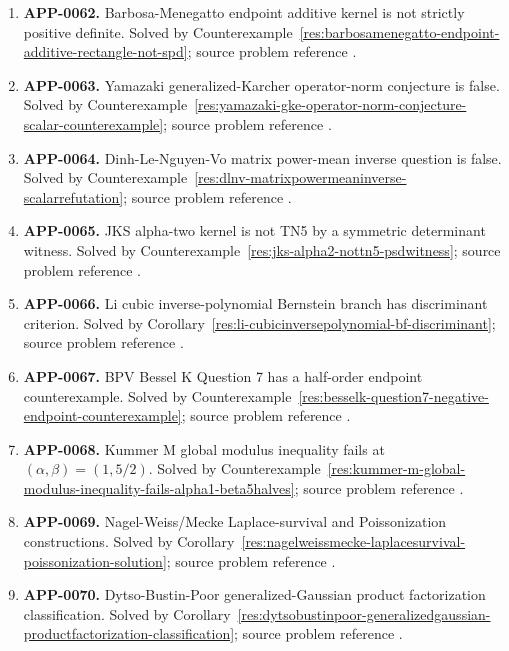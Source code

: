 \documentclass[11pt]{article}
\numberwithin{equation}{section}
\theoremstyle{definition}
\theoremstyle{remark}
\newcommand{\1}{\mathbf 1}
\begin{document}
\begin{enumerate}
\item \label{ledger:app-0062}\textbf{APP-0062.} Barbosa-Menegatto endpoint additive kernel is not strictly positive definite. Solved by Counterexample~\ref{res:barbosamenegatto-endpoint-additive-rectangle-not-spd}; source problem reference \cite{app-app-0062-source}.
\item \label{ledger:app-0063}\textbf{APP-0063.} Yamazaki generalized-Karcher operator-norm conjecture is false. Solved by Counterexample~\ref{res:yamazaki-gke-operator-norm-conjecture-scalar-counterexample}; source problem reference \cite{app-app-0063-source}.
\item \label{ledger:app-0064}\textbf{APP-0064.} Dinh-Le-Nguyen-Vo matrix power-mean inverse question is false. Solved by Counterexample~\ref{res:dlnv-matrixpowermeaninverse-scalarrefutation}; source problem reference \cite{app-app-0064-source}.
\item \label{ledger:app-0065}\textbf{APP-0065.} JKS alpha-two kernel is not TN5 by a symmetric determinant witness. Solved by Counterexample~\ref{res:jks-alpha2-nottn5-psdwitness}; source problem reference \cite{app-app-0065-source}.
\item \label{ledger:app-0066}\textbf{APP-0066.} Li cubic inverse-polynomial Bernstein branch has discriminant criterion. Solved by Corollary~\ref{res:li-cubicinversepolynomial-bf-discriminant}; source problem reference \cite{app-app-0066-source}.
\item \label{ledger:app-0067}\textbf{APP-0067.} BPV Bessel K Question 7 has a half-order endpoint counterexample. Solved by Counterexample~\ref{res:besselk-question7-negative-endpoint-counterexample}; source problem reference \cite{app-app-0056-source}.
\item \label{ledger:app-0068}\textbf{APP-0068.} Kummer M global modulus inequality fails at \((\alpha,\beta)=(1,5/2)\). Solved by Counterexample~\ref{res:kummer-m-global-modulus-inequality-fails-alpha1-beta5halves}; source problem reference \cite{app-app-0068-source}.
\item \label{ledger:app-0069}\textbf{APP-0069.} Nagel-Weiss/Mecke Laplace-survival and Poissonization constructions. Solved by Corollary~\ref{res:nagelweissmecke-laplacesurvival-poissonization-solution}; source problem reference \cite{app-app-0069-source}.
\item \label{ledger:app-0070}\textbf{APP-0070.} Dytso-Bustin-Poor generalized-Gaussian product factorization classification. Solved by Corollary~\ref{res:dytsobustinpoor-generalizedgaussian-productfactorization-classification}; source problem reference \cite{app-app-0070-source}.

\end{enumerate}
\end{document}
